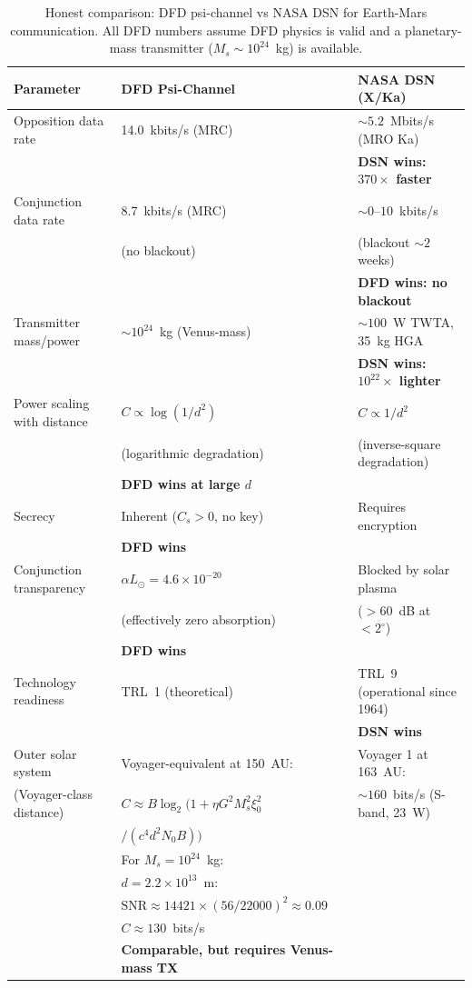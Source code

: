 \documentclass[aps,prd,twocolumn,superscriptaddress,nofootinbib]{revtex4-2}
\newcommand{\SNR}{\mathrm{SNR}}
\begin{document}
\begin{table}[t]
\centering
\caption{Honest comparison: DFD psi-channel vs NASA DSN for Earth-Mars
communication. All DFD numbers assume DFD physics is valid and a
planetary-mass transmitter ($M_s \sim 10^{24}$~kg) is available.}
\begin{tabular}{p{4.5cm}p{5.5cm}p{5.5cm}}
\hline\hline
\textbf{Parameter} & \textbf{DFD Psi-Channel} & \textbf{NASA DSN (X/Ka)} \\
\hline
Opposition data rate & 14.0~kbits/s (MRC) & $\sim 5.2$~Mbits/s (MRO Ka) \\
 & & \textbf{DSN wins: $370\times$ faster} \\
\hline
Conjunction data rate & 8.7~kbits/s (MRC) & $\sim 0$--$10$~kbits/s \\
 & (no blackout) & (blackout $\sim 2$ weeks) \\
 & & \textbf{DFD wins: no blackout} \\
\hline
Transmitter mass/power & $\sim 10^{24}$~kg (Venus-mass) & $\sim 100$~W TWTA, 35~kg HGA \\
 & & \textbf{DSN wins: $10^{22}\times$ lighter} \\
\hline
Power scaling with distance & $C \propto \log(1/d^2)$ & $C \propto 1/d^2$ \\
 & (logarithmic degradation) & (inverse-square degradation) \\
 & \textbf{DFD wins at large $d$} & \\
\hline
Secrecy & Inherent ($C_s > 0$, no key) & Requires encryption \\
 & \textbf{DFD wins} & \\
\hline
Conjunction transparency & $\alpha L_\odot = 4.6\times10^{-20}$ & Blocked by solar plasma \\
 & (effectively zero absorption) & ($> 60$~dB at $< 2^\circ$) \\
 & \textbf{DFD wins} & \\
\hline
Technology readiness & TRL~1 (theoretical) & TRL~9 (operational since 1964) \\
 & & \textbf{DSN wins} \\
\hline
Outer solar system & Voyager-equivalent at 150~AU: & Voyager 1 at 163~AU: \\
(Voyager-class distance) & $C \approx B\log_2(1 + \eta G^2 M_s^2 \xi_0^2$ & $\sim 160$~bits/s (S-band, 23~W) \\
 & $/(c^4 d^2 N_0 B))$ & \\
 & For $M_s = 10^{24}$~kg: & \\
 & $d = 2.2\times10^{13}$~m: & \\
 & $\SNR \approx 14421 \times (56/22000)^2 \approx 0.09$ & \\
 & $C \approx 130$~bits/s & \\
 & \textbf{Comparable, but requires Venus-mass TX} & \\
\hline\hline
\end{tabular}
\label{tab:dsn-comparison}
\end{table}
\end{document}
